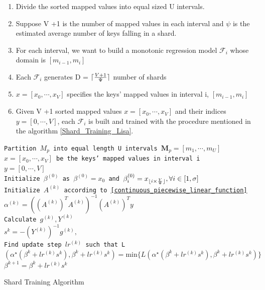 \begin{enumerate}
	\item Divide the sorted mapped values into equal sized U intervals.
	\item Suppose V +1 is the number of mapped values in each interval and $\psi$ is the estimated average number of keys falling in a shard.
	\item For each interval, we want to build a monotonic regression
    model $ \mathcal {F}_{i}$ whose domain is $[m_{i-1},m_{i}]$ 
 
 	\item Each $\mathcal{F}_{i}$ generates D = $\lceil\frac{V+1}{\Psi}\rceil$ number of shards 
    
    \item $x =[x_0,\cdots, x_V] $ specifies the keys' mapped values in interval i, $[m_{i-1},m_{i}]$ 
    
    \item Given V +1 sorted mapped values $x =[x_0,\cdots, x_V]$ and their indices $y =[0,\cdots, V]$, each $\mathcal{F}_{i}$ is built and trained with the procedure mentioned in the algorithm \ref{Shard_Training_Lisa}.
    

\end{enumerate}

\begin{algorithm}[H]
    \SetAlgoLined
    \texttt{Partition $M_{p}$ into equal length U intervals $\boldsymbol{M}_p=[m_1,\cdots, m_U]$ }
    {   
        \texttt{$x =[x_0,\cdots, x_V] $ be the keys' mapped values
        in interval i} \\
        \texttt{$y =[0,\cdots, V]$ } \\
        \texttt{Initialize $\beta^{(0)}$ as $\beta^{(0)}=x_0$ and $\beta_i^{(0)}=x_{\lfloor i\times \frac{V}{\Psi}\rfloor}, \forall i\in[1,\sigma]$} \\
        {
            \texttt{Initialize $A^{(k)}$ according to \eqref{continuous_piecewise_linear_function}} \\
            \texttt{$\alpha^{(k)}= ((A^{(k)})^T A^{(k)})^{-1}(A^{(k)})^Ty$} \\
            
            \texttt{Calculate $g^{(k)}, Y^{(k)}$ } \\
            \texttt{$s^{k} = -(Y^{(k)})^{-1} g^{(k)}, $ } \\
            
            \texttt{Find update step $lr^{(k)}$ such that    L$(\alpha^\star(\beta^{k}+ lr^{(k)}s^{k}), \beta^{k}+ lr^{(k)}s^{k}) =\text{min}\{L(\alpha^\star(\beta^{k}+ lr^{(k)}s^{k}), \beta^{k}+ lr^{(k)}s^{k})\} $} \\
            
            \texttt{$\beta^{k+1} = \beta^{k}+ lr^{(k)}s^{k}$ } \\
           
           
        }
    }
    
    \caption{Shard Training Algorithm}
    \label{Shard_Training_Lisa}
\end{algorithm}

